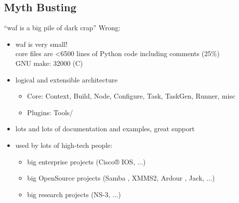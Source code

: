 \documentclass[xetex]{beamer}
\begin{document}
\subsection{Myth Busting}

\begin{frame}{“waf is a big pile of dark crap”}
	Wrong:
	\begin{itemize}
		\item waf is very small!\\
		core files are <6500 lines of Python code including comments (25\%)\\
		GNU make: 32000 (C)
		\item logical and extensible architecture
		\begin{itemize}
			\scriptsize
			\item Core: Context, Build, Node, Configure, Task, TaskGen, Runner, misc %
			\item Plugins: Tools/
		\end{itemize}
		\item lots and lots of documentation and examples, great support
		\item used by lots of high-tech people:
		\begin{itemize}
			\scriptsize
			\item big enterprise projects (Cisco® IOS, ...)
			\item big OpenSource projects (Samba \cite{samba_waf}, XMMS2, Ardour \cite{ardour_waf}, Jack, ...)
			\item big research projects (NS-3, ...)
		\end{itemize}
	\end{itemize}
\end{frame}
\end{document}
